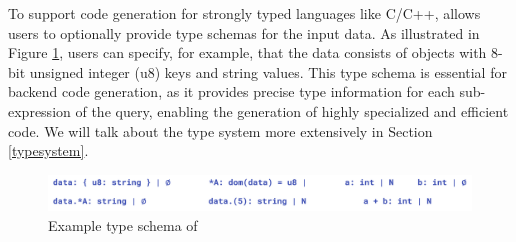 \documentclass[acmsmall,nonacm]{acmart}\settopmatter{printfolios=true,printccs=false,printacmref=false}
\newcommand{\rhyme}{\text{Rhyme}\xspace}
\begin{document}
To support code generation for strongly typed languages like C/C++, \rhyme allows users to optionally provide type schemas for the input data. As illustrated in Figure \ref{typeschema}, users can specify, for example, that the data consists of objects with 8-bit unsigned integer (u8) keys and string values. This type schema is essential for backend code generation, as it provides precise type information for each sub-expression of the query, enabling the generation of highly specialized and efficient code. We will talk about the type system more extensively in Section \ref{typesystem}.
\begin{figure}[H]
  \centering
      \includegraphics[scale=0.4]{figures/typeschema2.png}
      \caption{Example type schema of \rhyme}
      \label{typeschema}
  \end{figure}
\end{document}
